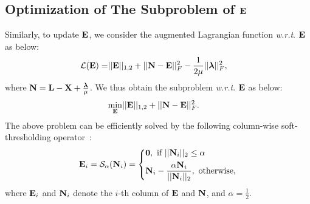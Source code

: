 \documentclass[10pt,twocolumn,letterpaper]{article}
\def\bN{{\bf N}}
\def\bE{{\bf E}}
\def\blambda{{\bm \lambda}}
\def\calL{{\mathcal{L}}}
\def\calS{{\mathcal{S}}}
\def\bL{{\bf L}}
\def\bX{{\bf X}}
\def\bX{{\bf X}}
\def\zerocolumn{{\bf 0}}
\def\wrt{\emph{w.r.t}}
\begin{document}
\subsection{Optimization of The Subproblem of $\bE$}

Similarly, to update $\bE$, we consider the augmented Lagrangian function \wrt. $\bE$ as below:
{\small
\begin{align}
\label{eq:subproblem_wrt_E_1}
  \calL (\bE) = & || \bE ||_{1,2} + || \bN - \bE ||_F^2 - \frac{1}{2\mu}|| \blambda ||_F^2   ,
\end{align}
}
\noindent
where $\bN = \bL - \bX + \frac{\blambda}{\mu}$.
We thus obtain the subproblem \wrt. $\bE$ as below:
{\small
\begin{align}
\label{eq:subproblem_wrt_E_2}
  \min_{\bE} & || \bE ||_{1,2} + || \bN - \bE ||_F^2 .
\end{align}
}
\noindent
The above problem can be efficiently solved by the following column-wise soft-thresholding operator~\cite{xiao2015FaLRR}:
{\small
\begin{align}\label{eq:column_wise_soft_thresholding}
  \bE_{i} = \calS_{\alpha}(\bN_{i}) = \left\{
    \begin{aligned}
      & \zerocolumn,~\text{if}~ ||\bN_{i}||_2 \leq \alpha   \\
      & \bN_{i} - \frac{\alpha \bN_{i}}{|| \bN_{i} ||_2},~\text{otherwise,}
    \end{aligned}
    \right.
\end{align}
}
\noindent
where $\bE_{i}$ and $\bN_{i}$ denote the $i$-th column of $\bE$ and $\bN$,
and $\alpha = \frac{1}{2}$.
\end{document}
